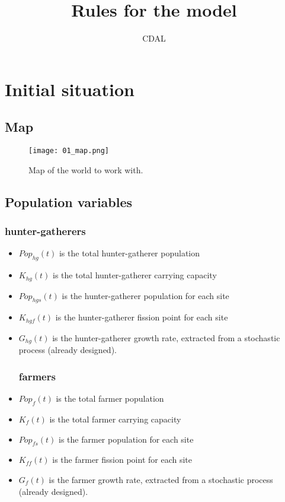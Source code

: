 \documentclass{article}
\title{Rules for the model}
\author{CDAL}
\begin{document}
\maketitle

\section{Initial situation}
\subsection{Map}

\begin{figure}[htp]
    \centering
    \texttt{[image: 01\_map.png]}
    \caption{Map of the world to work with.}
    \label{fig:map}
\end{figure}

\subsection{Population variables}

\subsubsection{hunter-gatherers}
\begin{itemize}
    \item $Pop_{hg}(t)$ is the total hunter-gatherer population
    \item $K_{hg}(t)$ is the total hunter-gatherer carrying capacity
    \item $Pop_{hgs}(t)$ is the hunter-gatherer population for each site
    \item $K_{hgf}(t)$ is the hunter-gatherer fission point for each site
    \item $G_{hg}(t)$ is the hunter-gatherer growth rate, extracted from a stochastic process (already designed).

\subsubsection{farmers}    
    \item $Pop_{f}(t)$ is the total farmer population
    \item $K_{f}(t)$ is the total farmer carrying capacity
    \item $Pop_{fs}(t)$ is the farmer population for each site
    \item $K_{ff}(t)$ is the farmer fission point for each site
    \item $G_{f}(t)$ is the farmer growth rate, extracted from a stochastic process (already designed).
\end{itemize}
\end{document}
